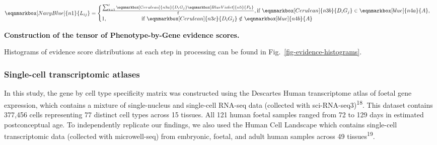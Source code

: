 \documentclass[
]{article}
\begin{document}
\hfill\break
\hfill\break

\[
 \eqnmarkbox[NavyBlue]{n1}{ L_{ij} } = 
 \begin{cases}
  \frac{\sum_{k=1}^{\text{f}} 
    \eqnmarkbox[Cerulean]{n3a}{D_i G_j} 
    \eqnmarkbox[BlueViolet]{n5}{P_k} 
    }{\text{f}}, 
  \text{if } \eqnmarkbox[Cerulean]{n3b}{D_i G_j} 
    \in \eqnmarkbox[blue]{n4a}{A},
  \\
  1, \hspace{2.2cm}
  \text{if } \eqnmarkbox[Cerulean]{n3c}{D_i G_j} 
    \notin\eqnmarkbox[blue]{n4b}{A}
 \end{cases}
\]

\hfill\break

\textbf{Construction of the tensor of Phenotype-by-Gene evidence
scores.}

\hfill\break

Histograms of evidence score distributions at each step in processing
can be found in Fig.~\ref{fig-evidence-histograms}.

\subsubsection{Single-cell transcriptomic
atlases}\label{single-cell-transcriptomic-atlases}

In this study, the gene by cell type specificity matrix was constructed
using the Descartes Human transcriptome atlas of foetal gene expression,
which contains a mixture of single-nucleus and single-cell RNA-seq data
(collected with sci-RNA-seq3)\textsuperscript{18}. This dataset contains
377,456 cells representing 77 distinct cell types across 15 tissues. All
121 human foetal samples ranged from 72 to 129 days in estimated
postconceptual age. To independently replicate our findings, we also
used the Human Cell Landscape which contains single-cell transcriptomic
data (collected with microwell-seq) from embryonic, foetal, and adult
human samples across 49 tissues\textsuperscript{19}.
\end{document}
